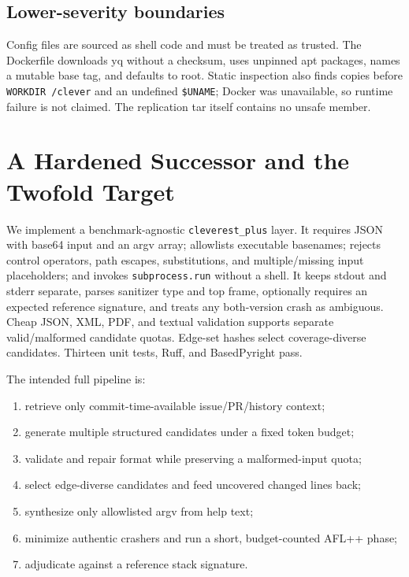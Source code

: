 \documentclass{article}
\begin{document}
\subsection{Lower-severity boundaries}

Config files are sourced as shell code and must be treated as trusted.  The
Dockerfile downloads yq without a checksum, uses unpinned apt packages, names a
mutable base tag, and defaults to root.  Static inspection also finds copies
before \texttt{WORKDIR /clever} and an undefined \texttt{\$UNAME}; Docker was
unavailable, so runtime failure is not claimed.  The replication tar itself
contains no unsafe member.

\section{A Hardened Successor and the Twofold Target}
\label{sec:improvement}

We implement a benchmark-agnostic \texttt{cleverest\_plus} layer.  It requires
JSON with base64 input and an argv array; allowlists executable basenames;
rejects control operators, path escapes, substitutions, and multiple/missing
input placeholders; and invokes \texttt{subprocess.run} without a shell.  It
keeps stdout and stderr separate, parses sanitizer type and top frame, optionally
requires an expected reference signature, and treats any both-version crash as
ambiguous.  Cheap JSON, XML, PDF, and textual validation supports separate
valid/malformed candidate quotas.  Edge-set hashes select coverage-diverse
candidates.  Thirteen unit tests, Ruff, and BasedPyright pass.

The intended full pipeline is:
\begin{enumerate}[nosep]
  \item retrieve only commit-time-available issue/PR/history context;
  \item generate multiple structured candidates under a fixed token budget;
  \item validate and repair format while preserving a malformed-input quota;
  \item select edge-diverse candidates and feed uncovered changed lines back;
  \item synthesize only allowlisted argv from help text;
  \item minimize authentic crashers and run a short, budget-counted AFL++ phase;
  \item adjudicate against a reference stack signature.
\end{enumerate}
\end{document}
